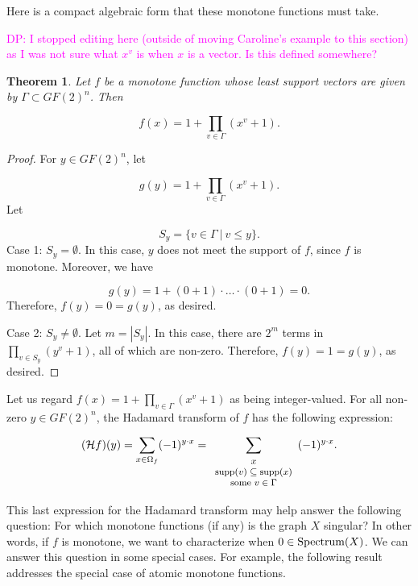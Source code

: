 \documentclass[12pt]{article}
\def\magenta#1{\textcolor{magenta}{#1}}
\newcommand{\djp}[1]{\magenta{DP: #1}}
\newcommand{\djp}[1]{}
\newtheorem{theorem}{Theorem}
\begin{document}
\vskip 5in
Here is a compact algebraic form that these
monotone functions must take.

\djp{I stopped editing here (outside of moving Caroline's example to
  this section) as I was not sure what $x^v$ is when $x$ is a vector.
  Is this defined somewhere?}

\begin{theorem}
Let $f$ be a monotone function whose least
support vectors are given by $\Gamma \subset GF(2)^n$.
Then

\[
f(x) = 1+\prod_{v\in\Gamma} (x^v+1).
\]
\end{theorem}

\begin{proof}
For $y \in GF(2)^n$, let

\[
g(y) = 1+\prod_{v\in\Gamma} (x^v+1).
\]
Let

\[
S_y = \{v\in \Gamma \ |\ v\leq y\}.
\]
Case 1: $S_y=\emptyset$. In this case, $y$ does not
meet the support of $f$, since $f$ is monotone. Moreover, we have

\[
g(y)=1+(0+1)\cdot \dots \cdot (0+1)=0.
\]
Therefore, $f(y)=0=g(y)$, as desired.

\noindent
Case 2: $S_y \not=\emptyset$. Let $m = |S_y|$.
In this case, there are $2^m$ terms in
$\prod_{v\in S_y} (y^v+1)$, all of which are non-zero.
Therefore, $f(y)=1=g(y)$, as desired.

\end{proof}

Let us regard ${f}(x) = 1+\prod_{v\in\Gamma} (x^v+1)$
as being integer-valued.  For all non-zero $y \in GF(2)^n$, the
Hadamard transform of $f$ has the following
expression:

\[
({\mathcal{H}}f)(y) =\sum_{x\in \Omega_f}  (-1)^{y \cdot x} =
\sum_{{\footnotesize{
\begin{array}{c}
x \\
{\rm supp}(v) \subseteq {\rm supp}(x) \\
{\rm some}\ v\in  \Gamma
\end{array}
}}}
(-1)^{y \cdot x}.
\]

This last expression for the Hadamard transform may help answer
the following question: For which monotone functions (if any) is the graph
$X$ singular? In other words, if $f$ is monotone,
we want to characterize when $0\in {\rm Spectrum}(X)$.
We can answer this question in some special cases.
For example, the following result addresses the special case of atomic
monotone functions.
\end{document}
